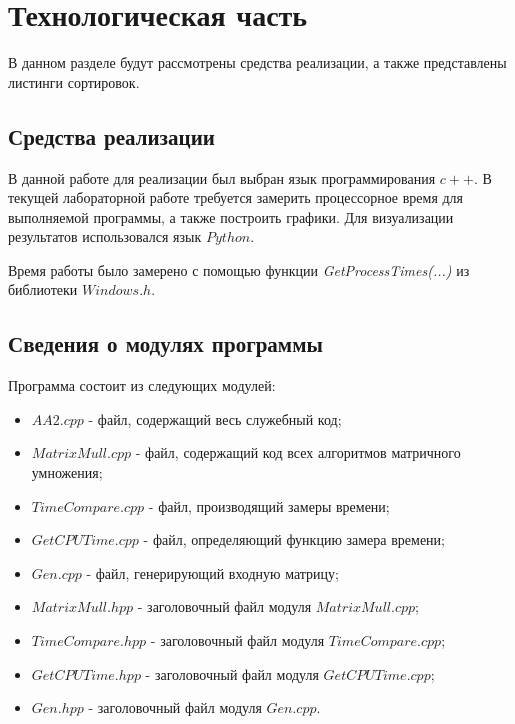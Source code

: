 \chapter{Технологическая часть}
В данном разделе будут рассмотрены средства реализации, а также представлены листинги сортировок.
\section{Средства реализации}
В данной работе для реализации был выбран язык программирования $c++$. В текущей лабораторной работе требуется замерить процессорное время для выполняемой программы, а также построить графики. Для визуализации результатов использовался язык $Python$.

Время работы было замерено с помощью функции \textit{GetProcessTimes(...)} \cite{time} из библиотеки $Windows.h$.

\section{Сведения о модулях программы}
Программа состоит из следующих модулей:
\begin{itemize}
	\item $AA2.cpp$ - файл, содержащий весь служебный код;
	\item $MatrixMull.cpp$ - файл, содержащий код всех алгоритмов матричного умножения;
	\item $TimeCompare.cpp$ - файл, производящий замеры времени;
	\item $GetCPUTime.cpp$ - файл, определяющий функцию замера времени;
	\item $Gen.cpp$ - файл, генерирующий входную матрицу;
	\newpage
	\item $MatrixMull.hpp$ - заголовочный файл модуля $MatrixMull.cpp$;
	\item $TimeCompare.hpp$ - заголовочный файл модуля $TimeCompare.cpp$;
	\item $GetCPUTime.hpp$ - заголовочный файл модуля $GetCPUTime.cpp$;
	\item $Gen.hpp$ - заголовочный файл модуля $Gen.cpp$.\newline
\end{itemize}

